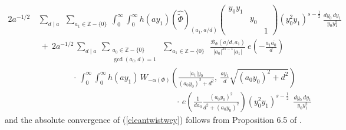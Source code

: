 \documentclass[11pt,reqno]{amsart}
\theoremstyle{definition}
\theoremstyle{definition}
\theoremstyle{remark}
\newcommand{\Z}{\ensuremath{\mathbb{Z}}}
\numberwithin{equation}{section}
\begin{document}
\begin{align}\label{cleantwistwey}
	 2a^{-1/2}  \,  &\sum_{d \mid a} \ 
		\ \sum_{a_{1}\in \Z-\{0\}}  \    \int_{0}^{\infty} \int_{0}^{\infty} h(ay_{1}) \left(\widehat{\widetilde{\Phi}}\right)_{(a_{1}, a/d)} \begin{pmatrix}
			y_{0}y_{1}&  & \\
			& y_{0} & \\
			&           & 1
		\end{pmatrix} (y_{0}^2 y_{1})^{s-\frac{1}{2}} \ \frac{dy_{0} \, dy_{1}}{y_{0} y_{1}^2} \nonumber\\[0.1in]
&   \ + \  2a^{-1/2} \,  \sum_{d \mid a} \ 
\sum_{\substack{a_{0} \in \Z -\{0\} \\ \gcd(a_{0}, d)=1}} \ \sum_{a_{1} \in \Z-\{0\}} \	   \ \frac{\mathcal{B}_{\Phi}\left(a/d, a_{1}   \right)}{|a_{0}|^{2s-1} |a_{1}|}\ e\left(-\frac{a_{1}\overline{a_{0}}}{d}\right) \nonumber\\[0.1in] 
&\hspace{50pt} \cdot  \,  \int_{0}^{\infty} \int_{0}^{\infty} h(ay_{1}) \, W_{-\alpha(\Phi)}\left( \frac{|a_{1}|y_{0}}{(a_{0} y_{0})^2+d^2}, \ \frac{ay_{1}}{d}\sqrt{(a_{0} y_{0})^2+d^2} \right) \nonumber\\[0.1in] 
&\hspace{200pt} \cdot \, e\left(\frac{1}{da_{0}}\frac{(a_{0}y_{0})^2}{d^2+(a_{0}y_{0})^2}\right)  (y_{0}^2 y_{1})^{s-\frac{1}{2}}  \ \ \frac{dy_{0}\, dy_{1}}{y_{0} y_{1}^2} 
\end{align}
and the absolute convergence of (\ref{cleantwistwey}) follows from Proposition 6.5 of \cite{Kw23}. 
\end{document}
